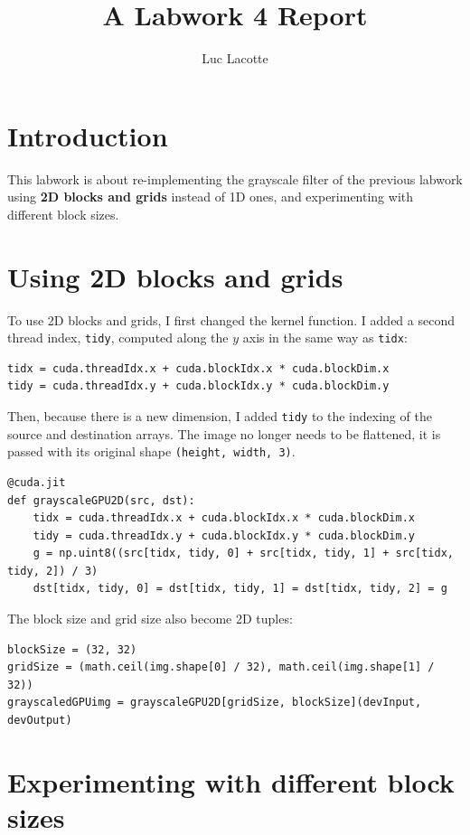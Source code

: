 \documentclass{report}
\title{A Labwork 4 Report}
\author{Luc Lacotte}
\date{}
\begin{document}
\maketitle

\section{Introduction}
This labwork is about re-implementing the grayscale filter of the previous labwork using \textbf{2D blocks and grids} instead of 1D ones, and experimenting with different block sizes.

\section{Using 2D blocks and grids}
To use 2D blocks and grids, I first changed the kernel function. I added a second thread index, \texttt{tidy}, computed along the $y$ axis in the same way as \texttt{tidx}:

\begin{lstlisting}
tidx = cuda.threadIdx.x + cuda.blockIdx.x * cuda.blockDim.x
tidy = cuda.threadIdx.y + cuda.blockIdx.y * cuda.blockDim.y
\end{lstlisting}

Then, because there is a new dimension, I added \texttt{tidy} to the indexing of the source and destination arrays. The image no longer needs to be flattened, it is passed with its original shape \texttt{(height, width, 3)}.

\begin{lstlisting}
@cuda.jit
def grayscaleGPU2D(src, dst):
    tidx = cuda.threadIdx.x + cuda.blockIdx.x * cuda.blockDim.x
    tidy = cuda.threadIdx.y + cuda.blockIdx.y * cuda.blockDim.y
    g = np.uint8((src[tidx, tidy, 0] + src[tidx, tidy, 1] + src[tidx, tidy, 2]) / 3)
    dst[tidx, tidy, 0] = dst[tidx, tidy, 1] = dst[tidx, tidy, 2] = g
\end{lstlisting}

The block size and grid size also become 2D tuples:

\begin{lstlisting}
blockSize = (32, 32)
gridSize = (math.ceil(img.shape[0] / 32), math.ceil(img.shape[1] / 32))
grayscaledGPUimg = grayscaleGPU2D[gridSize, blockSize](devInput, devOutput)
\end{lstlisting}

\section{Experimenting with different block sizes}
\end{document}
